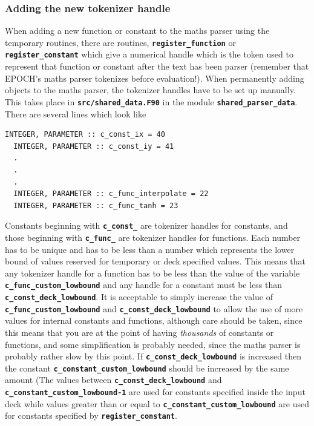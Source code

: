\documentclass[12pt,a4paper]{article}
\newcommand{\simpleboxverbatim}{\begin{Verbatim}[obeytabs=true,frame=single,
  framerule=0.5mm,rulecolor=\color{warwickmid},formatcom=\color{black}]}
\newcommand{\inlinecode}[1]{{\color{warwickred} \bf\texttt{#1}}}
\begin{document}
\subsubsection{Adding the new tokenizer handle}
When adding a new function or constant to the maths parser using the temporary
routines, there are routines, \inlinecode{register\_function} or
\inlinecode{register\_constant} which give a numerical handle which is the token
used to represent that function or constant after the text has been parser
(remember that EPOCH's maths parser tokenizes before evaluation!). When
permanently adding objects to the maths parser, the tokenizer handles have to
be set up manually. This takes place in \inlinecode{src/shared\_data.F90} in
the module \inlinecode{shared\_parser\_data}. There are several lines which
look like
\simpleboxverbatim
  INTEGER, PARAMETER :: c_const_ix = 40
  INTEGER, PARAMETER :: c_const_iy = 41
  .
  .
  .
  INTEGER, PARAMETER :: c_func_interpolate = 22
  INTEGER, PARAMETER :: c_func_tanh = 23
\end{Verbatim}
Constants beginning with \inlinecode{c\_const\_} are tokenizer handles for
constants, and those beginning with \inlinecode{c\_func\_} are tokenizer handles
for functions. Each number has to be unique and has to be less than a number
which represents the lower bound of values reserved for temporary or deck
specified values. This means that any tokenizer handle for a function has to be
less than the value of the variable \inlinecode{c\_func\_custom\_lowbound} and any
handle for a constant must be less than \inlinecode{c\_const\_deck\_lowbound}. It
is acceptable to simply increase the value of
\inlinecode{c\_func\_custom\_lowbound} and \inlinecode{c\_const\_deck\_lowbound} to
allow the use of more values for internal constants and functions, although
care should be taken, since this means that you are at the point of having {\it
thousands} of constants or functions, and some simplification is probably
needed, since the maths parser is probably rather slow by this point. If
\inlinecode{c\_const\_deck\_lowbound} is increased then the constant
\inlinecode{c\_constant\_custom\_lowbound} should be increased by the same amount
(The values between \inlinecode{c\_const\_deck\_lowbound} and\linebreak
\inlinecode{c\_constant\_custom\_lowbound-1} are used for constants specified
inside the input deck while values greater than or equal to
\inlinecode{c\_constant\_custom\_lowbound} are used for constants specified by\linebreak
\inlinecode{register\_constant}.
\end{document}
